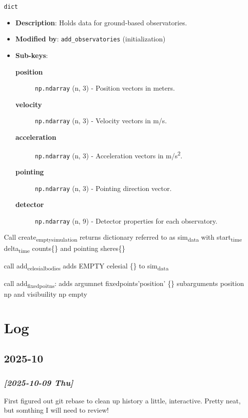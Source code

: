 \documentclass[11pt]{article}
\begin{document}
\begin{description}
\item[{\textbf{observatories}}] \texttt{dict}
\begin{itemize}
\item \textbf{Description}: Holds data for ground-based observatories.
\item \textbf{Modified by}: \texttt{add\_observatories} (initialization)
\item \textbf{Sub-keys}:
\begin{description}
\item[{\textbf{position}}] \texttt{np.ndarray} (n, 3) - Position vectors in meters.
\item[{\textbf{velocity}}] \texttt{np.ndarray} (n, 3) - Velocity vectors in m/s.
\item[{\textbf{acceleration}}] \texttt{np.ndarray} (n, 3) - Acceleration vectors in m/s\textsuperscript{2}.
\item[{\textbf{pointing}}] \texttt{np.ndarray} (n, 3) - Pointing direction vector.
\item[{\textbf{detector}}] \texttt{np.ndarray} (n, 9) - Detector properties for each observatory.
\end{description}
\end{itemize}

\item Call create\textsubscript{empty}\textsubscript{simulation}
returns dictionary referred to as sim\textsubscript{data}
with start\textsubscript{time} delta\textsubscript{time}  counts\{\} and pointing sheres\{\}
\item call add\textsubscript{celesial}\textsubscript{bodies}
adds EMPTY celesial \{\} to sim\textsubscript{data}
\item call add\textsubscript{fixed}\textsubscript{poitns}: adds argumnet fixedpoints'position' \{\}
subarguments position np and visibuility np empty
\item 
\end{description}




\section{Log}
\label{sec:org0b37bd6}

\subsection{2025-10}
\label{sec:orgb106ff3}

\subsubsection{\textit{[2025-10-09 Thu]}}
\label{sec:orgddd4938}
First figured out git rebase to clean up history a little, interactive.
Pretty neat, but somthing I will need to review!
\end{document}
